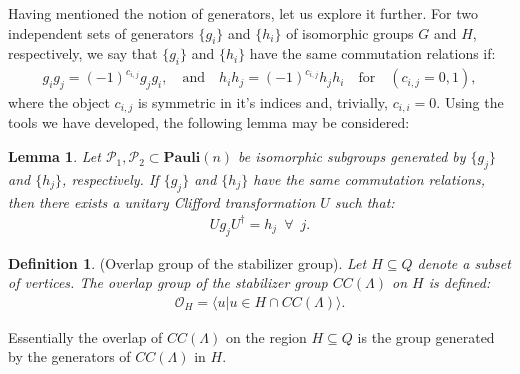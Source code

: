 \documentclass[12pt]{article}
\newtheorem{lemma}[theorem]{Lemma}
\theoremstyle{definition}
\newtheorem{definition}[theorem]{Definition}
\begin{document}
Having mentioned the notion of generators, let us explore it further. For two independent sets of generators $\{g_i\}$ and $\{h_i\}$ of isomorphic groups $G$ and $H$, respectively, we say that $\{g_i\}$ and $\{h_i\}$ have the same commutation relations if:
    \begin{align}
        g_ig_j = (-1)^{c_{i,j}}g_jg_i,\enspace\enspace\text{and}\enspace\enspace h_ih_j = (-1)^{c_{i,j}}h_jh_i\enspace\enspace\text{for}\enspace\enspace (c_{i,j} = 0,1),
    \end{align}
where the object $c_{i,j}$ is symmetric in it's indices and, trivially, $c_{i,i} = 0$. Using the tools we have developed, the following lemma may be considered:
    \begin{lemma}
        Let $\mathcal{P}_1,\mathcal{P}_2\subset\textbf{Pauli}(n)$ be isomorphic subgroups generated by $\{g_j\}$ and $\{h_j\}$, respectively. If $\{g_j\}$ and $\{h_j\}$ have the same commutation relations, then there exists a unitary Clifford transformation $U$ such that:
            \begin{align}
                Ug_jU^\dagger = h_j\enspace\forall\enspace j.
            \end{align}
    \end{lemma}
    \begin{definition}(Overlap group of the stabilizer group).
        \emph{Let $H\subseteq Q$ denote a subset of vertices. The overlap group of the stabilizer group $CC(\Lambda)$ on $H$ is defined:}
            \begin{align}
                \mathcal{O}_H = \langle u|u\in H\cap CC(\Lambda)\rangle.
            \end{align}
    \end{definition}
Essentially the overlap of $CC(\Lambda)$ on the region $H\subseteq Q$ is the group generated by the generators of $CC(\Lambda)$ in $H$.\newline
\end{document}
